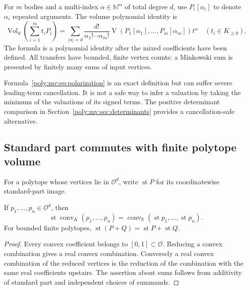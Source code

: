 \documentclass[11pt,a4paper]{article}
\numberwithin{equation}{section}
\theoremstyle{plain}
\newcommand{\wtag}{\textup{[write]}}%
\newcommand{\R}{\mathbb R}
\newcommand{\N}{\mathbb N}
\newcommand{\st}{\operatorname{st}}
\newcommand{\conv}{\operatorname{conv}}
\newcommand{\OO}{\mathcal O}
\newcommand{\Vol}{\operatorname{Vol}}
\newcommand{\MV}{\operatorname{V}}
\begin{document}
For $m$ bodies and a multi-index $\alpha\in\N^m$ of total degree $d$, use
$P_i[\alpha_i]$ to denote $\alpha_i$ repeated arguments. The volume
polynomial identity is
\begin{equation}
\label{poly:mv:eq:volume-polynomial}
 \Vol_d\left(\sum_{i=1}^m t_iP_i\right)
 =\sum_{|\alpha|=d}\frac{d!}{\alpha_1!\cdots\alpha_m!}
   \MV(P_1[\alpha_1],\ldots,P_m[\alpha_m])t^\alpha
 \quad(t_i\in K_{\ge0}).
\end{equation}
The formula is a polynomial identity after the mixed coefficients have
been defined. All transfers have bounded, finite vertex counts: a
Minkowski sum is presented by finitely many sums of input vertices.

\begin{remark}
Formula~\eqref{poly:mv:eq:polarization} is an exact definition but can suffer
severe leading-term cancellation. It is not a safe way to infer a
valuation by taking the minimum of the valuations of its signed terms.
The positive determinant comparison in Section~\ref{poly:mv:sec:determinants}
provides a cancellation-safe alternative.
\end{remark}

\subsection{Standard part commutes with finite polytope volume}
For a polytope whose vertices lie in $\OO^d$, write $\st P$ for its
coordinatewise standard-part image.

\begin{lemma}
\label{poly:mv:lem:hull-reduction}
If $p_1,\ldots,p_n\in\OO^d$, then
\[
 \st\conv_K(p_1,\ldots,p_n)
   =\conv_\R(\st p_1,\ldots,\st p_n).
\]
For bounded finite polytopes, $\st(P+Q)=\st P+\st Q$.
\end{lemma}
\begin{proof}
Every convex coefficient belongs to $[0,1]\subset\OO$. Reducing a convex
combination gives a real convex combination. Conversely a real convex
combination of the reduced vertices is the reduction of the combination
with the same real coefficients upstairs. The assertion about sums follows
from additivity of standard part and independent choices of summands.
\end{proof}

\noindent[\wtag{} The first identity, $\st\conv=\conv\st$ for a finite
bounded hull, is Part~I's \cref{poly:prop:stconv}, where it is proved
(manuscripts 05 and 02); Part~IV's \cref{poly:ehr:lem:shadow} states it once
more. The Minkowski-sum clause, the proof above, and the volume and
mixed-volume clauses built on it in \cref{poly:mv:prop:volume-reduction} are
manuscript~06's own and are printed only here.]
\end{document}
